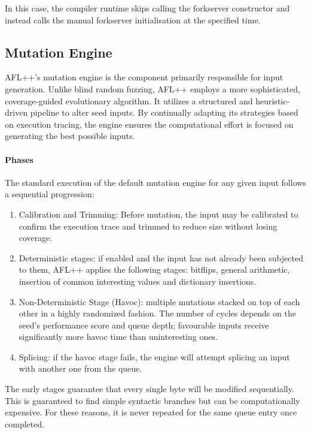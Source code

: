 In this case, the compiler runtime skips calling the forkserver constructor and instead calls the manual forkserver initialisation at the specified time. 

\subsection{Mutation Engine}

AFL++'s mutation engine is the component primarily responsible for input generation. Unlike blind random fuzzing, AFL++ employs a more sophisticated, coverage-guided evolutionary algorithm. It utilizes a structured and heuristic-driven pipeline to alter seed inputs. By continually adapting its strategies based on execution tracing, the engine ensures the computational effort is focused on generating the best possible inputs.

\paragraph{Phases} The standard execution of the default mutation engine for any given input follows a sequential progression:
\begin{enumerate}
    \item Calibration and Trimming: Before mutation, the input may be calibrated to confirm the execution trace and trimmed to reduce size without losing coverage.

    \item Deterministic stages: if enabled and the input has not already been subjected to them, AFL++ applies the following stages: bitflips, general arithmetic, insertion of common interesting values and dictionary insertions.

    \item Non-Deterministic Stage (Havoc): multiple mutations stacked on top of each other in a highly randomized fashion. The number of cycles depends on the seed's performance score and queue depth; favourable inputs receive significantly more havoc time than uninteresting ones.

    \item Splicing: if the havoc stage fails, the engine will attempt splicing an input with another one from the queue.
\end{enumerate}

The early stages guarantee that every single byte will be modified sequentially. This is guaranteed to find simple syntactic branches but can be computationally expensive. For these reasons, it is never repeated for the same queue entry once completed.